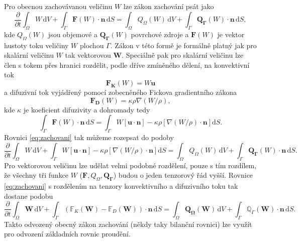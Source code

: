Pro obecnou zachovávanou veličinu $W$ lze zákon zachování psát jako
\begin{equation}\label{eq:zachovani}
\dfrac{\partial}{\partial t} \int_{\Omega}W\,\mathrm{d}V + \int_{\Gamma}\mathbf{F}(W) \cdot \mathbf{n} \, \mathrm{d}S = \int_{\Omega}Q_\Omega(W) \, \mathrm{d}V + \int_{\Gamma} \mathbf{Q_\Gamma}(W) \cdot \mathbf{n} \, \mathrm{d}S,
\end{equation}
kde $Q_{\Omega}(W)$ jsou objemové a  $\mathbf{Q_\Gamma}(W)$ povrchové zdroje a $\mathbf{F}(W) $ je vektor hustoty toku veličiny $W$ plochou $\Gamma$. Zákon v této formě je formálně platný jak pro skalární veličinu $W$ tak vektorovou $\mathbf{W}$. Speciálně pak pro skalární veličinu lze člen s tokem přes hranici rozdělit, podle dříve zmíněného dělení, na konvektivní tok
\begin{equation}\label{eq:konv_tok}
\mathbf{F_K}(W) = W\mathbf{u}
\end{equation}
a difuzivní tok vyjádřený pomocí zobecněného Fickova gradientního zákona
\begin{equation}\label{eq:diff_tok}
\mathbf{F_D}(W) = \kappa \rho \nabla(W/\rho),
\end{equation}
kde $\kappa$ je koeficient difuzivity a dohromady tedy
\begin{equation*}
\int_{\Gamma}\mathbf{F}(W) \cdot \mathbf{n} \, \mathrm{d}S = \int_{\Gamma}W\left[\mathbf{u}\cdot\mathbf{n}\right] - \kappa \rho \left[\nabla(W/\rho)\cdot \mathbf{n} \right] \mathrm{d}S.
\end{equation*}
Rovnici \ref{eq:zachovani} tak můžeme rozepsat do podoby
\begin{equation}\label{eq:zachovani_skalarStoky}
\dfrac{\partial}{\partial t} \int_{\Omega}W\,\mathrm{d}V + \int_{\Gamma}W\left[\mathbf{u}\cdot\mathbf{n}\right] - \kappa \rho \left[\nabla(W/\rho)\cdot \mathbf{n} \right] \mathrm{d}S = \int_{\Omega}Q_\Omega(W) \, \mathrm{d}V + \int_{\Gamma} \mathbf{Q_\Gamma}(W) \cdot \mathbf{n} \, \mathrm{d}S.
\end{equation}
Pro vektorovou veličinu lze udělat velmi podobné rozdělení, pouze s tím rozdílem, že všechny tři funkce $W$ ($\mathbf{F}, Q_{\Omega}, \mathbf{Q_\Gamma}$) budou o jeden tenzorový řád vyšší. Rovnice \ref{eq:zachovani} s rozdělením na tenzory konvektivního a difuzivního toku tak dostane podobu
\begin{equation}\label{eq:zachovani_vektor}
\dfrac{\partial}{\partial t} \int_{\Omega}\mathbf{W} \, \mathrm{d}V + \int_{\Gamma}\left(\mathbb{F}_K(\mathbf{W})-\mathbb{F}_D(\mathbf{W}) \right)\cdot \mathbf{n} \, \mathrm{d}S = \int_{\Omega} \mathbf{Q_\Omega}(\mathbf{W}) \, \mathrm{d}V + \int_{\Gamma} \mathbb{Q}_\Gamma(\mathbf{W}) \cdot \mathbf{n} \, \mathrm{d}S.
\end{equation}
Takto odvozený obecný zákon zachování (někdy taky bilanční rovnici) lze využít pro odvození základních rovnic proudění.



